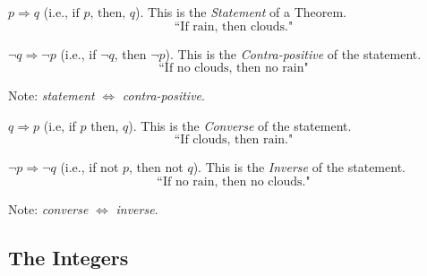 \documentclass{article}
\def \proofDistance {5pt}
\begin{document}
        \vspace{\proofDistance}
    
        \begin{terminology}
            $p \Rightarrow q$ (i.e., $\text{if } p \text{, then, } q$). This is the \textit{Statement} of a Theorem. $$\text{``If rain, then clouds."}$$
        \end{terminology}
    
        \begin{terminology}
            $\neg q \Rightarrow \neg p$ (i.e., if $\neg q$, then $\neg p$). This is the \textit{Contra-positive} of the statement. $$\text{``If no clouds, then no rain"}$$
        \end{terminology}
    
        Note: \textit{statement} $\iff$ \textit{contra-positive}.
    
        \vspace{\proofDistance}
    
        \begin{terminology}
            $q \Rightarrow p$ (i.e, if $p$ then, $q$). This is the \textit{Converse} of the statement. $$\text{``If clouds, then rain."}$$ 
        \end{terminology}
    
        \begin{terminology}
            $\neg p \Rightarrow \neg q$ (i.e., if not $p$, then not $q$). This is the \textit{Inverse} of the statement. $$\text{``If no rain, then no clouds."}$$
        \end{terminology} 
        Note: \textit{converse} $\iff$ \textit{inverse}.

\newpage

    \subsection{The Integers}
\end{document}

